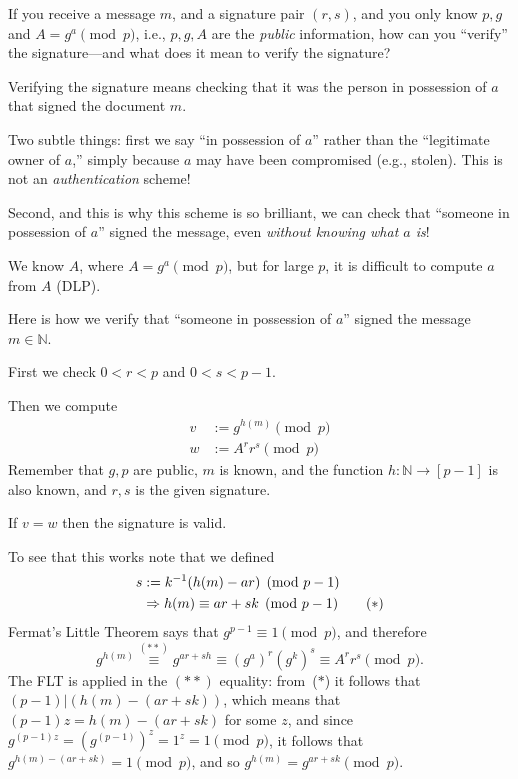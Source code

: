 \begin{frame}

If you receive a message $m$, and a signature pair $(r,s)$, and
you only know $p,g$ and $A=g^a\pmod p$, i.e., $p,g,A$ are the {\em
public} information, how can you ``verify'' the signature---and what
does it mean to verify the signature?

Verifying the signature means checking that it was
the person in possession of $a$ that signed the document $m$.  

Two
subtle things: first we say ``in possession of $a$'' rather than the
``legitimate owner of $a$,'' simply because $a$ may have been
compromised (e.g., stolen).  This is not an {\em authentication}
scheme!  

Second, and this is why this scheme
is so brilliant, we can check that ``someone in possession of $a$''
signed the message, even {\em without knowing what $a$ is}!  

We know
$A$, where $A=g^a\pmod p$, but for large $p$, it is difficult to
compute $a$ from $A$ (DLP).
\end{frame}

\begin{frame}
Here is how we verify that ``someone in possession of $a$'' signed the
message $m\in\mathbb{N}$.  

First we check $0<r<p$ and $0<s<p-1$. 

Then we compute
\begin{align*}
v &:= g^{h(m)}\pmod p\\
w &:= A^rr^s\pmod p
\end{align*}
Remember that $g,p$ are public, $m$ is
known, and the function $h:\mathbb{N}\longrightarrow[p-1]$ is also
known, and $r,s$ is the given signature.  

If $v=w$ then
the signature is valid.
\end{frame}

\begin{frame}
To see that this works note that we defined
\begin{align*}
s &:= k^{-1}(h(m)-ar)\pmod{p-1} \\
  &\Rightarrow h(m)\equiv ar+sk\pmod{p-1}\tag*{\text{$(\ast)$}}
\end{align*}
Fermat's Little Theorem says
that $g^{p-1}\equiv 1\pmod p$, and therefore
$$
g^{h(m)}\stackrel{(\ast\ast)}{\equiv}g^{ar+sh}
\equiv (g^a)^r(g^k)^s
\equiv A^rr^s\pmod p.
$$
The FLT is applied in the $(\ast\ast)$ equality:  from~($\ast$)
it follows that $(p-1)|(h(m)-(ar+sk))$, which
means that $(p-1)z=h(m)-(ar+sk)$ for some $z$, and since
$g^{(p-1)z}=(g^{(p-1)})^z=1^z=1\pmod p$, it follows that
$g^{h(m)-(ar+sk)}=1\pmod p$, and so $g^{h(m)}=g^{ar+sk}\pmod p$.

\end{frame}

